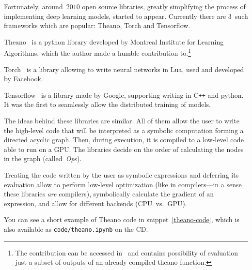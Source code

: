 Fortunately, around~$2010$ open source libraries, greatly simplifying the process of implementing deep learning models, started to appear. Currently there are $3$~such frameworks which are popular: Theano, Torch and Tensorflow.

Theano~\cite{theano} is a python library developed by Montreal Institute for Learning Algorithms, which the author made a humble contribution to.\footnote{The contribution can be accessed in~\cite{theano-contrib} and contains possibility of evaluation just a subset of outputs of an already compiled theano function.}

Torch~\cite{torch} is a library allowing to write neural networks in Lua, used and developed by Facebook.

Tensorflow~\cite{tensorflow} is a library made by Google, supporting writing in C\texttt{++} and python. It was the first to seamlessly allow the distributed training of models.

The ideas behind these libraries are similar. All of them allow the user to write the high-level code that will be interpreted as a symbolic computation forming a directed acyclic graph. Then, during execution, it is compiled to a low-level code able to run on a GPU. The libraries decide on the order of calculating the nodes in the graph (called~\emph{Op}s).

Treating the code written by the user as symbolic expressions and deferring its evaluation allow to perform low-level optimization (like in compilers---in a sense these libraries \textit{are} compilers), symbolically calculate the gradient of an expression, and allow for different backends (CPU~vs.~GPU).

\renewcommand{\figurename}{Snippet}
You can see a short example of Theano code in snippet~\ref{theano-code}, which is also available as \texttt{code/theano.ipynb} on the CD.

